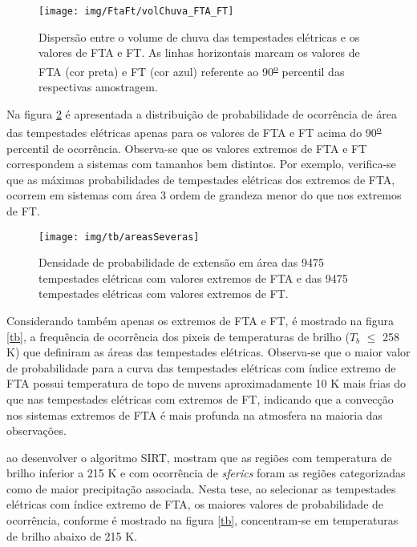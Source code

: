 \begin{figure}[!hb]
  \centering 
  \texttt{[image: img/FtaFt/volChuva\_FTA\_FT]}
  \caption{Dispersão entre o volume de chuva das tempestades elétricas e os valores de FTA e FT.  As linhas horizontais marcam os valores de FTA (cor preta) e FT (cor azul) referente ao 90\textsuperscript{\underline{o}} percentil das respectivas amostragem.}
  \label{volchuvaFTAFT}
\end{figure}


Na figura \ref{size} é apresentada a distribuição de probabilidade de ocorrência de área das tempestades elétricas apenas para os valores de FTA e FT acima do 90\textsuperscript{\underline{o}} percentil de ocorrência. Observa-se que os valores extremos de FTA e FT correspondem a sistemas com tamanhos bem distintos. Por exemplo, verifica-se que as máximas probabilidades de tempestades elétricas dos extremos de FTA, ocorrem em sistemas com área 3 ordem de grandeza menor do que nos extremos de FT.


\begin{figure}[!ht]
  \centering
  \texttt{[image: img/tb/areasSeveras]}   
  \caption{Densidade de probabilidade de extensão em área das 9475 tempestades elétricas com valores extremos de FTA  e das 9475 tempestades elétricas com valores extremos de FT.}
  \label{size}  
\end{figure}

Considerando também apenas os extremos de FTA e FT, é mostrado na figura \ref{tb}, a frequência de ocorrência dos pixeis de temperaturas de brilho ($T_b$ $\leq$ 258 K) que definiram as áreas das tempestades elétricas. Observa-se que o maior valor de probabilidade para a curva das tempestades elétricas com índice extremo de FTA possui temperatura de topo de nuvens aproximadamente 10 K mais frias do que nas tempestades elétricas com extremos de FT, indicando que a convecção nos sistemas extremos de FTA é mais profunda na atmosfera na maioria das observações.

 ao desenvolver o algoritmo  SIRT, mostram que as regiões com temperatura de brilho inferior a 215 K e com ocorrência de \textit{sferics} foram as regiões categorizadas como de maior precipitação associada. Nesta tese, ao selecionar as tempestades elétricas com índice extremo de FTA, os maiores valores de probabilidade de ocorrência, conforme é mostrado na figura \ref{tb}, concentram-se em temperaturas de brilho abaixo de 215 K.




